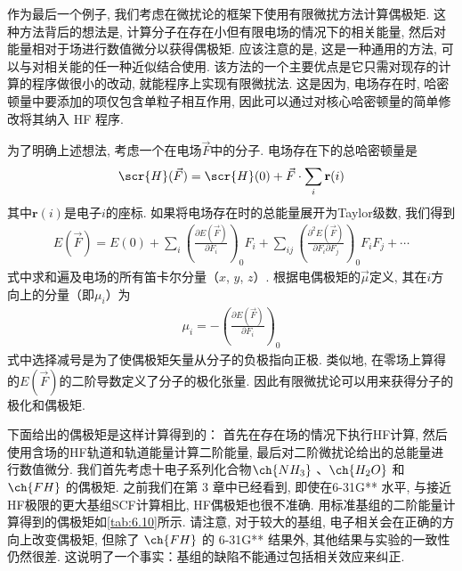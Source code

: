 作为最后一个例子, 我们考虑在微扰论的框架下使用有限微扰方法计算偶极矩.  
这种方法背后的想法是, 计算分子在存在小但有限电场的情况下的相关能量, 
然后对能量相对于场进行数值微分以获得偶极矩.  
应该注意的是, 这是一种通用的方法, 可以与对相关能的任一种近似结合使用.  
该方法的一个主要优点是它只需对现存的计算的程序做很小的改动, 就能程序上实现有限微扰法.  
这是因为, 电场存在时, 哈密顿量中要添加的项仅包含单粒子相互作用, 因此可以通过对核心哈密顿量的简单修改将其纳入 HF 程序. 

为了明确上述想法, 考虑一个在电场$\vec{F}$中的分子. 电场存在下的总哈密顿量是
\begin{align}
	\scr{H}(\vec{F}) = \scr{H}(0) + \vec{F}\cdot \sum_i \mathbf{r}(i)
\end{align}
其中$\mathbf{r}(i)$是电子$i$的座标. 如果将电场存在时的总能量展开为Taylor级数, 我们得到
\begin{align}
	E(\vec{F}) = E(0) + \sum_i \left(\frac{\partial E(\vec{F})}{\partial F_i} \right)_0 F_i + \sum_{ij} \left(\frac{\partial^2 E(\vec{F})}{\partial F_i\partial F_j} \right)_0 F_iF_j + \cdots
\end{align}
式中求和遍及电场的所有笛卡尔分量（$x$, $y$, $z$）. 根据电偶极矩的$\vec{\mu}$定义, 其在$i$方向上的分量（即$\mu_i$）为
\begin{align}
	\mu_i = -\left(\frac{\partial E(\vec{F})}{\partial F_i}\right)_0
\end{align}
式中选择减号是为了使偶极矩矢量从分子的负极指向正极. 类似地, 在零场上算得的$E(\vec{F})$的二阶导数定义了分子的极化张量. 因此有限微扰论可以用来获得分子的极化和偶极矩. 

下面给出的偶极矩是这样计算得到的：
首先在存在场的情况下执行HF计算, 然后使用含场的HF轨道和轨道能量计算二阶能量, 
最后对二阶微扰论给出的总能量进行数值微分.  
我们首先考虑十电子系列化合物$\ch{NH_3}$ 、$\ch{H_2O}$ 和$\ch{FH}$ 的偶极矩.  
之前我们在第 3 章中已经看到, 即使在6-31G** 水平, 与接近HF极限的更大基组SCF计算相比, HF偶极矩也很不准确. 
用标准基组的二阶能量计算得到的偶极矩如\autoref{tab:6.10}所示.  
请注意, 对于较大的基组, 电子相关会在正确的方向上改变偶极矩, 
但除了 $\ch{FH}$ 的 6-31G** 结果外, 其他结果与实验的一致性仍然很差.  
这说明了一个事实：基组的缺陷不能通过包括相关效应来纠正. 

